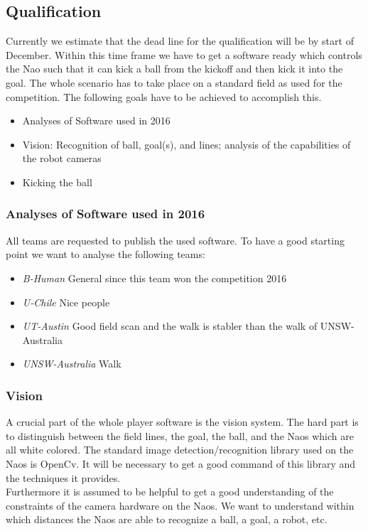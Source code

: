 \documentclass[12pt]{article}
\begin{document}
\pagebreak

\subsection{Qualification}
Currently we estimate that the dead line for the qualification will be by start of December. Within this time frame we have to get a software ready which controls the Nao such that it can kick a ball from the kickoff and then kick it into the goal. The whole scenario has to take place on a standard field as used for the competition. The following goals have to be achieved to accomplish this.
\begin{itemize}
	\item Analyses of Software used in 2016
	\item Vision: Recognition of ball, goal(s), and lines; analysis of the capabilities of the robot cameras
	\item Kicking the ball
\end{itemize}

\subsubsection{Analyses of Software used in 2016}
All teams are requested to publish the used software. To have a good starting point we
want to analyse the following teams: 
\begin{itemize}
	\item {\em B-Human} General since this team won the competition 2016
	\item {\em U-Chile} Nice people
	\item {\em UT-Austin} Good field scan and the walk is stabler than the walk of UNSW-Australia
	\item {\em UNSW-Australia} Walk
\end{itemize}

\subsubsection{Vision}
A crucial part of the whole player software is the vision system. The hard part is to distinguish between the field lines, the goal, the ball, and the Naos which are all white colored. The standard image detection/recognition library used on the Naos is OpenCv. It will be necessary to get a good command of this library and the techniques it provides. \\
Furthermore it is assumed to be helpful to get a good understanding of the constraints of the camera hardware on the Naos. We want to understand within which distances the Naos are able to recognize a ball, a goal, a robot, etc.
\end{document}
